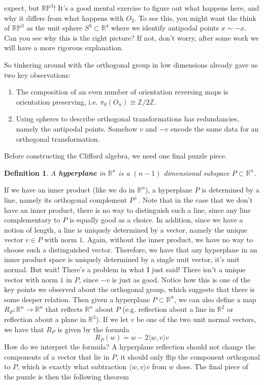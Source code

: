 \documentclass{article}
\newcommand{\R}{\mathbb{R}}
\newcommand{\Z}{\mathbb{Z}}
\newtheorem{definition}{Definition}[subsection]
\begin{document}
expect, but $\mathbb{RP}^3$! It's a good mental exercise to figure out what happens here, and why it differs from what happens with $O_2$. To see this, you might want the think of $\mathbb{RP}^3$ as the unit sphere $S^3 \subset \R^4$ where we identify antipodal points $x \sim -x$. Can you see why this is the right picture? If not, don't worry, after some work we will have a more rigorous explanation.

So tinkering around with the orthogonal group in low dimensions already gave us two key observations:
\begin{enumerate}
\item The composition of an even number of orientation reversing maps is orientation preserving, i.e. $\pi_0(O_n) \cong \Z/2\Z$.
\item Using spheres to describe orthogonal transformations has redundancies, namely the antipodal points. Somehow $v$ and $-v$ encode the same data for an orthogonal transformation.
\end{enumerate}
Before constructing the Clifford algebra, we need one final puzzle piece.
\begin{definition}
A \textbf{hyperplane} in $\R^n$ is a $(n-1)$ dimensional subspace $P \subset \R^n$.
\end{definition}
If we have an inner product (like we do in $\R^n$), a hyperplane $P$ is determined by a line, namely its orthogonal complement $P^\perp$. Note that in the case that we don't have an inner product, there is no way to distinguish such a line, since any line complementary to $P$ is equally good as a choice. In addition, since we have a notion of length, a line is uniquely determined by a vector, namely the unique vector $v \in P$ with norm $1$. Again, without the inner product, we have no way to choose such a distinguished vector. Therefore, we have that any hyperplane in an inner product space is uniquely determined by a single unit vector, it's unit normal. But wait! There's a problem in what I just said! There isn't a unique vector with norm $1$ in $P$, since $-v$ is just as good. Notice how this is one of the key points we observed about the orthogonal group, which suggests that there is some deeper relation. Then given a hyperplane $P \subset \R^n$, we can also define a map $R_P : \R^n \to \R^n$ that reflects $\R^n$ about $P$ (e.g. reflection about a line in $\R^2$ or reflection about a plane in $\R^3$). If we let $v$ be one of the two unit normal vectors, we have that $R_P$ is given by the formula
$$R_P(w) = w -2\langle w, v \rangle v $$
How do we interpret the formula? A hyperplane reflection should not change the components of a vector that lie in $P$, it should only flip the component orthogonal to $P$, which is exactly what subtraction $\langle w,v \rangle v$ from $w$ does. The final piece of the puzzle is then the following theorem
\end{document}
